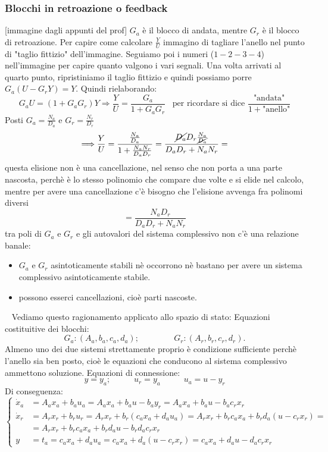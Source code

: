 \subsubsection{Blocchi in retroazione o feedback}
[immagine dagli appunti del prof]\newline
$G_a$ è il blocco di andata, mentre $G_r$ è il blocco di retroazione.\newline
Per capire come calcolare $\frac{Y}{U}$ immagino di tagliare l'anello nel punto di "taglio fittizio" dell'immagine. Seguiamo poi i numeri ($1-2-3-4$) nell'immagine per capire quanto valgono i vari segnali. Una volta arrivati al quarto punto, ripristiniamo il taglio fittizio e quindi possiamo porre $G_a(U-G_r Y) = Y$. Quindi rielaborando:
\[
    G_a U = (1+G_aG_r)Y \Longrightarrow \frac{Y}{U} = \frac{G_a}{1 + G_a G_r} \;\;\;\text{per ricordare si dice $\frac{\text{"andata"}}{1+ \text{"anello"}}$}
\]
Posti $G_a = \frac{N_a}{D_a}$ e $G_r = \frac{N_r}{D_r}$
\[
    \Longrightarrow \frac{Y}{U} = \frac{\frac{N_a}{D_a}}{1 + \frac{N_aN_r}{D_aD_r}} = \frac{\cancel{D_a}D_r \frac{N_a}{\cancel{D_a}}}{D_aD_r + N_aN_r}=
\]
questa elisione non è una cancellazione, nel senso che non porta a una parte nascosta, perchè è lo stesso polinomio che compare due volte e si elide nel calcolo, mentre per avere una cancellazione c'è bisogno che l'elisione avvenga fra polinomi diversi
\[
    = \frac{N_aD_r}{D_aD_r +N_aN_r}
\]
tra poli di $G_a$ e $G_r$ e gli autovalori del sistema complessivo non c'è una relazione banale:
\begin{itemize}
    \item $G_a$ e $G_r$ asintoticamente stabili nè occorrono nè bastano per avere un sistema complessivo asintoticamente stabile.
    \item possono esserci cancellazioni, cioè parti nascoste.
\end{itemize}
\ \newline
Vediamo questo ragionamento applicato allo spazio di stato:\newline
Equazioni costituitive dei blocchi:
\[
    G_a : (A_a, b_a, c_a,d_a); \;\;\;\;\;\;\;\;\;\;\;\;\;\;\; G_r : (A_r, b_r,c_r,d_r).
\]
Almeno uno dei due sistemi strettamente proprio è condizione sufficiente perchè l'anello sia ben posto, cioè le equazioni che conducono al sistema complessivo ammettono soluzione.\newline
Equazioni di connessione:
\[
    y = y_a; \;\;\;\;\;\;\;\;\;\; u_r = y_a \;\;\;\;\;\;\;\;\;\; u_a = u - y_r
\]
Di conseguenza:
\[
    \begin{cases}
        \dot{x}_a &= A_a x_a + b_a u_a = A_a x_a + b_a u - b_a y_r = A_a x_a + b_a u - b_a c_r x_r\\
        \dot{x}_r &= A_r x_r + b_r u_r = A_r x_r + b_r(c_ax_a + d_au_a) = A_r x_r + b_rc_ax_a + b_r d_a (u-c_rx_r) =\\
         &= A_r x_r + b_r c_a x_a + b_r d_a u - b_rd_ac_rx_r\\
        y &= t_a = c_ax_a + d_au_a = c_a x_a + d_a(u-c_rx_r) = c_ax_a + d_a u - d_a c_rx_r
    \end{cases}
\]
